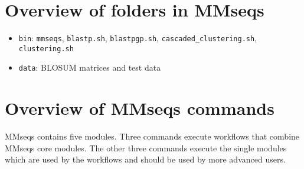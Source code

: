 \documentclass[11pt,a4paper]{report}
\begin{document}
\section{Overview of folders in MMseqs}
\begin{itemize}
\item \texttt{bin}:  \texttt{mmseqs}, \texttt{blastp.sh}, \texttt{blastpgp.sh}, \texttt{cascaded\_clustering.sh}, \texttt{clustering.sh}
\item \texttt{data}: BLOSUM matrices and test data
\end{itemize}

\section{Overview of MMseqs commands}

MMseqs contains five modules. Three commands execute workflows that
combine MMseqs core modules. The other three commands execute the
single modules which are used by the workflows and should be used
by more advanced users.
\end{document}
